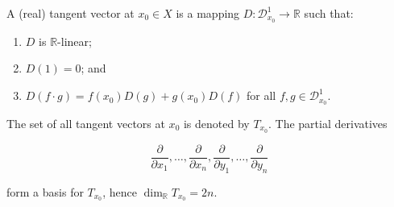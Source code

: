 A (real) tangent vector at $x_0 \in X$ is a mapping $D: \mathcal{D}_{x_0}^1 \to \mathbb{R}$ such that:

\begin{enumerate}
  \item $D$ is $\mathbb{R}$-linear;
  \item $D(1) = 0$; and
  \item $D(f \cdot g) = f(x_0) D(g) + g(x_0) D(f)$ for all $f, g \in \mathcal{D}_{x_0}^1$.
\end{enumerate}

The set of all tangent vectors at $x_0$ is denoted by $T_{x_0}$. The partial derivatives

$$\frac{\partial}{\partial x_1}, \ldots, \frac{\partial}{\partial x_n}, \frac{\partial}{\partial y_1}, \ldots, \frac{\partial}{\partial y_n}$$

form a basis for $T_{x_0}$, hence $\dim_{\mathbb{R}} T_{x_0} = 2n$.
